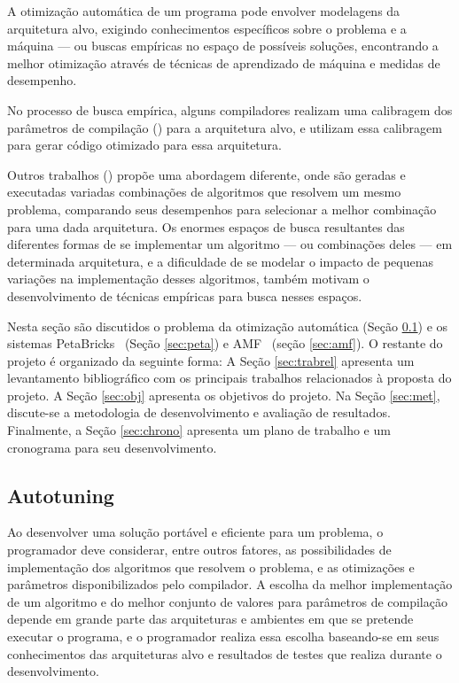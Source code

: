 \documentclass[a4paper, 11pt]{article}
\begin{document}
A otimização automática de um programa pode envolver modelagens da
arquitetura alvo, exigindo conhecimentos específicos sobre o problema e a
máquina --- ou buscas empíricas no espaço de possíveis soluções, encontrando
a melhor otimização através de técnicas de aprendizado de máquina e medidas de
desempenho.

No processo de busca empírica, alguns compiladores realizam uma calibragem dos 
parâmetros de compilação (\citet{bilmes1997,whaley1998}) para a arquitetura 
alvo, e utilizam essa calibragem para gerar código otimizado para essa 
arquitetura. 

Outros trabalhos (\citet{goldman2012framework,mitcsail-tr:2014,
vuduc2004}) propõe uma abordagem diferente, onde são geradas e executadas 
variadas combinações de algoritmos que resolvem um mesmo problema, comparando 
seus desempenhos para selecionar a melhor combinação para uma dada arquitetura.
Os enormes espaços de busca resultantes das diferentes formas de se implementar
um algoritmo --- ou combinações deles --- em determinada arquitetura, e a 
dificuldade de se modelar o impacto de pequenas variações na implementação 
desses algoritmos, também motivam o desenvolvimento de técnicas empíricas para
busca nesses espaços.

Nesta seção são discutidos o problema da otimização automática
(Seção \ref{sec:autotuning}) e os sistemas PetaBricks~\cite{ansel2014phd}
(Seção \ref{sec:peta}) e AMF~\cite{goldman2012framework} (seção \ref{sec:amf}).
O restante do projeto é organizado da seguinte forma: 
A Seção \ref{sec:trabrel} apresenta um 
levantamento bibliográfico com os principais trabalhos relacionados à proposta
do projeto.
A Seção \ref{sec:obj} 
apresenta os objetivos do projeto. Na Seção \ref{sec:met}, discute-se a 
metodologia de desenvolvimento e avaliação de resultados. Finalmente, 
a Seção \ref{sec:chrono} apresenta um plano de trabalho e um cronograma para 
seu desenvolvimento. 

\subsection{Autotuning} \label{sec:autotuning}

Ao desenvolver uma solução portável e eficiente para um problema, o
programador deve considerar, entre outros fatores, as possibilidades
de implementação dos algoritmos que resolvem o problema, e as otimizações e 
parâmetros disponibilizados pelo compilador.
A escolha da melhor implementação de um algoritmo e do melhor conjunto de 
valores para parâmetros de compilação depende em grande parte das arquiteturas 
e ambientes em que se pretende executar o programa, e o programador realiza 
essa escolha baseando-se em seus conhecimentos das arquiteturas alvo e 
resultados de testes que realiza durante o desenvolvimento.
\end{document}
